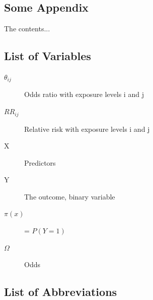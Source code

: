 \documentclass[10pt,a4paper]{report}
\begin{document}
\begin{appendices}

\chapter{Some Appendix}
The contents...

\section{List of Variables}

\begin{description}
\item[$\theta_{ij}$]
  Odds ratio with exposure levels i and j
\item[$RR_{ij}$]
  Relative risk with exposure levels i and j
\item[X]
  Predictors
\item[Y]
  The outcome, binary variable
\item[$\pi(x)$]
  = $P(Y=1)$
\item[$\Omega$]
  Odds
\end{description}

\section{List of Abbreviations}


\end{appendices}
\end{document}
